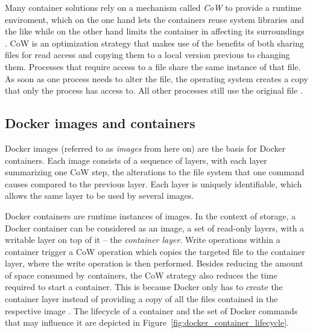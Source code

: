     Many container solutions rely on a mechanism called \emph{\ac{CoW}} to provide a runtime enviroment, which on the one hand lets the containers reuse system libraries and the like while on the other hand limits the container in affecting its surroundings \cite{Docker2016Docker,Pahl2015Containerization}.
    \ac{CoW} is an optimization strategy that makes use of the benefits of both sharing files for read access and copying them to a local version previous to changing them. Processes that require access to a file share the same instance of that file. As soon as one process needs to alter the file, the operating system creates a copy that only the process has access to. All other processes still use the original file \cite{Pahl2015Containerization,Docker2016Docker}.

  \subsection{Docker images and containers} %
  \label{sub:docker_images_and_containers}
    Docker images (referred to as \emph{images} from here on) are the basis for Docker containers. Each image consists of a sequence of layers, with each layer summarizing one \ac{CoW} step, \ie the alterations to the file system that one command causes compared to the previous layer. Each layer is uniquely identifiable, which allows the same layer to be used by several images.

    Docker containers are runtime instances of images.
    In the context of storage, a Docker container can be considered as an image, \ie a set of read-only layers, with a writable layer on top of it -- the \emph{container layer}. Write operations within a container trigger a \ac{CoW} operation which copies the targeted file to the container layer, where the write operation is then performed.
    Besides reducing the amount of space consumed by containers, the \ac{CoW} strategy also reduces the time required to start a container. This is because Docker only has to create the container layer instead of providing a copy of all the files contained in the respective image \cite{Docker2016Docker}. The lifecycle of a container and the set of Docker commands that may influence it are depicted in Figure~\ref{fig:docker_container_lifecycle}.

